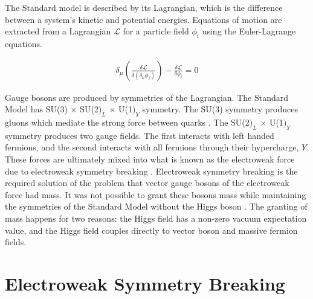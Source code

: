 The Standard model is described by its Lagrangian,
which is the difference between a system's kinetic and potential energies.
Equations of motion are extracted from a Lagrangian $\mathcal{L}$
for a particle field $\phi_i$ using the Euler-Lagrange equations.

\begin{gather}
  \delta_\mu\left(\frac{\delta \mathcal{L}}{\delta(\delta_\mu \phi_i)}\right) -
  \frac{\delta \mathcal{L}}{\delta \phi_i} = 0
\end{gather}

Gauge bosons are produced by symmetries of the Lagrangian.
The Standard Model has SU(3) $\times$ SU(2$)_L$ $\times$ U(1$)_Y$ symmetry.
The SU(3) symmetry produces gluons which mediate the strong force between quarks \cite{PhysRevLett.30.1343}.
The SU(2$)_L$ $\times$ U(1$)_Y$ symmetry produces two gauge fields.
The first interacts with left handed fermions,
and the second interacts with all fermions through their hypercharge, $Y$.
These forces are ultimately mixed into what is known as the electroweak force
due to electroweak symmetry breaking \cite{PhysRevLett.19.1264}.
Electroweak symmetry breaking is the required solution of the problem that
vector gauge bosons of the electroweak force had mass.
It was not possible to grant these bosons mass while maintaining the symmetries of the Standard Model
without the Higgs boson \cite{PhysRevLett.13.321, PhysRevLett.13.508, PhysRevLett.13.585}.
The granting of mass happens for two reasons:
the Higgs field has a non-zero vacuum expectation value,
and the Higgs field couples directly to vector boson and massive fermion fields.

\section{Electroweak Symmetry Breaking}

